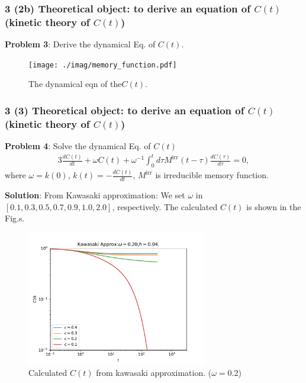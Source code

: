 \documentclass[8pt]{beamer}
\begin{document}
\begin{frame}
	\frametitle{3 (2b) Theoretical object: to derive an equation of $C(t)$ (kinetic theory of $C(t)$)}
	{\textbf{Problem 3}}: Derive the dynamical Eq. of $C(t)$.
	\begin{figure}
		\centering
		\texttt{[image: ./imag/memory\_function.pdf]}
		\setlength{\abovecaptionskip}{0pt}
		\caption{The dynamical eqn of the$C(t)$.}
	\end{figure}
\end{frame}

\begin{frame}
	\frametitle{3 (3) Theoretical object: to derive an equation of $C(t)$ (kinetic theory of $C(t)$)}
	{\textbf{Problem 4}}: Solve the dynamical Eq. of $C(t)$
	\begin{alignat}{3}
		\frac{dC(t)}{dt} + \omega C(t) + \omega^{-1} \int_0^t d\tau M^\text{irr}(t-\tau) \frac{dC(\tau)}{d\tau} = 0,\nonumber
	\end{alignat}
	where $\omega = k(0)$, $k(t) = -\frac{dC(t)}{dt}$, $M^\text{irr}$ is irreducible memory function. 
	
	{\textbf{Solution}}:  From
    Kawasaki approximation:
   We set $\omega$ in  $[0.1,0.3,0.5,0.7,0.9,1.0,2.0]$, respectively.  The calculated $C(t)$ is shown in the Fig.s.
   	\begin{figure}
   	\centering
   	\includegraphics [width=0.7\textwidth] {../../kawasaki_approx/imag/beta_dependence_of_corr_omega0.20_step13_h0.04_loglog.pdf}
   	\setlength{\abovecaptionskip}{0pt}
   	\caption{Calculated $C(t)$ from kawasaki approximation. ($\omega = 0.2$)  }
   \end{figure}
\end{frame}
\end{document}
